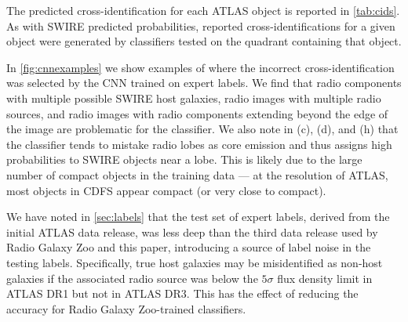 \documentclass[fleqn,usenatbib,usedcolumn]{mnras}
\begin{document}
    The predicted cross-identification for each ATLAS object is reported in
    \autoref{tab:cids}. As with SWIRE predicted probabilities, reported
    cross-identifications for a given object were generated by classifiers
    tested on the quadrant containing that object.

    In \autoref{fig:cnnexamples} we show examples of where the incorrect
    cross-identification was selected by the CNN trained on expert labels. We
    find that radio components with multiple possible SWIRE host galaxies,
    radio images with multiple radio sources, and radio images with radio
    components extending beyond the edge of the image are problematic for the
    classifier. We also note in (c), (d), and (h) that the classifier tends to
    mistake radio lobes as core emission and thus assigns high probabilities
    to SWIRE objects near a lobe. This is likely due to the large number of
    compact objects in the training data --- at the resolution of ATLAS, most
    objects in CDFS appear compact (or very close to compact).

    We have noted in \autoref{sec:labels} that the test set of expert labels,
    derived from the initial ATLAS data release, was less deep than the third
    data release used by Radio Galaxy Zoo and this paper, introducing a source
    of label noise in the testing labels. Specifically, true host galaxies may
    be misidentified as non-host galaxies if the associated radio source was
    below the $5\sigma$ flux density limit in ATLAS DR1 but not in ATLAS DR3.
    This has the effect of reducing the accuracy for Radio Galaxy Zoo-trained
    classifiers.
\end{document}
